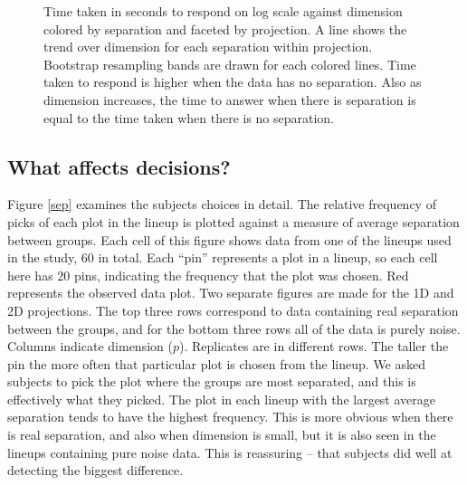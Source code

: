 \begin{figure}[hbtp]
   \centering
      \caption{Time taken in seconds to respond on log scale against dimension colored by separation and faceted by projection. A line shows the trend over dimension for each separation within projection. Bootstrap resampling bands are drawn for each colored lines. Time taken to respond is higher when the data has no separation. Also as dimension increases, the time to answer when there is separation is equal to the time taken when there is no separation. }
       \label{time-taken}
\end{figure}

\subsection{What affects decisions?}

\normalsize

Figure \ref{sep} examines the subjects choices in detail. The relative frequency of picks of each plot in the lineup is plotted against a measure of average separation between groups. Each cell of this figure shows data from one of the lineups used in the study, 60 in total. Each ``pin'' represents a plot in a lineup, so each cell here has 20 pins, indicating the frequency that the plot was chosen. Red represents the observed data plot. Two separate figures are made for the 1D and 2D projections. The top three rows correspond to data containing real separation between the groups, and for the bottom three rows all of the data is purely noise. Columns indicate dimension ($p$). Replicates are in different rows. The taller the pin the more often that particular plot is chosen from the lineup. We asked subjects to pick the plot where the groups are most separated, and this is effectively what they picked. The plot in each lineup with the largest average separation tends to have the highest frequency. This is more obvious when there is real separation, and also when dimension is small, but it is also seen in the lineups containing pure noise data. This is reassuring -- that subjects did well at detecting the biggest difference.  

